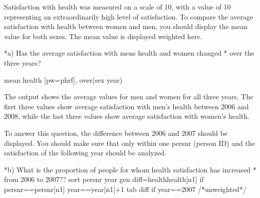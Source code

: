 \documentclass[letterpaper,10pt,openany,onesideH,english]{sphinxmanual}
\begin{document}


Satisfaction with health was measured on a scale of 10, with a value of 10 representing an extraordinarily high level of satisfaction. To compare the average satisfaction with health between women and men, you should display the mean value for both sexes. The mean value is displayed weighted here.

%
\begin{sphinxVerbatim}[commandchars=\\\{\},numbers=left,firstnumber=1,stepnumber=1]
*a) Has the average satisfaction with men\PYGZsq{}s health and women changed 
*   over the three years?

	  mean health [pw=phrf], over(sex year)
\end{sphinxVerbatim}

\begin{figure}[H]
\centering

\noindent{}
\end{figure}

The output shows the average values for men and women for all three years. The first three values show average satisfaction with men’s health between 2006 and 2008, while the last three values show average satisfaction with women’s health.


To answer this question, the difference between 2006 and 2007 should be displayed. You should make sure that only within one persnr (person ID) and the satisfaction of the following year should be analyzed.

%
\begin{sphinxVerbatim}[commandchars=\\\{\},numbers=left,firstnumber=1,stepnumber=1]
*b) What is the proportion of people for whom health satisfaction has increased 
*   from 2006 to 2007?? 
	sort persnr year
	gen diff=health\PYGZhy{}health[\PYGZus{}n\PYGZhy{}1] if persnr==persnr[\PYGZus{}n\PYGZhy{}1] \PYGZam{} year==year[\PYGZus{}n\PYGZhy{}1]+1
	tab diff if year==2007				/*unweighted*/
\end{sphinxVerbatim}
\end{document}

